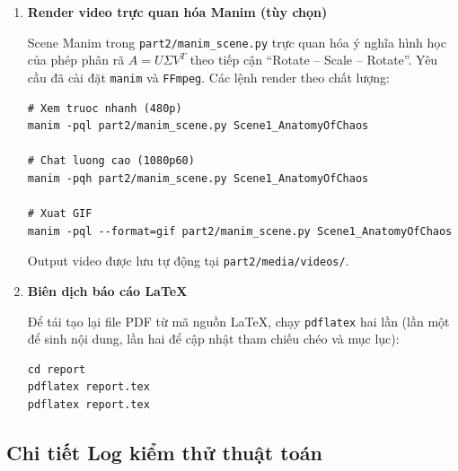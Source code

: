 \begin{enumerate}
    Để xem phân tích trực quan hóa đầy đủ (log-log chart, bảng sai số tương đối), mở Jupyter Notebook:
\begin{tcolorbox}[mycodebox]
\begin{verbatim}
jupyter notebook
# Mo file: part3/analysis.ipynb
\end{verbatim}
\end{tcolorbox}

    \item \textbf{Render video trực quan hóa Manim (tùy chọn)}

    Scene Manim trong \texttt{part2/manim\_scene.py} trực quan hóa ý nghĩa hình học của phép
    phân rã $A = U\Sigma V^T$ theo tiếp cận ``Rotate -- Scale -- Rotate''. Yêu cầu đã cài đặt
    \texttt{manim} và \texttt{FFmpeg}. Các lệnh render theo chất lượng:
\begin{tcolorbox}[mycodebox]
\begin{verbatim}
# Xem truoc nhanh (480p)
manim -pql part2/manim_scene.py Scene1_AnatomyOfChaos

# Chat luong cao (1080p60)
manim -pqh part2/manim_scene.py Scene1_AnatomyOfChaos

# Xuat GIF
manim -pql --format=gif part2/manim_scene.py Scene1_AnatomyOfChaos
\end{verbatim}
\end{tcolorbox}

    Output video được lưu tự động tại \texttt{part2/media/videos/}.

    \item \textbf{Biên dịch báo cáo LaTeX}

    Để tái tạo lại file PDF từ mã nguồn \LaTeX{}, chạy \texttt{pdflatex} hai lần
    (lần một để sinh nội dung, lần hai để cập nhật tham chiếu chéo và mục lục):
\begin{tcolorbox}[mycodebox]
\begin{verbatim}
cd report
pdflatex report.tex
pdflatex report.tex
\end{verbatim}
\end{tcolorbox}

\end{enumerate}

\newpage

\subsection{Chi tiết Log kiểm thử thuật toán}

